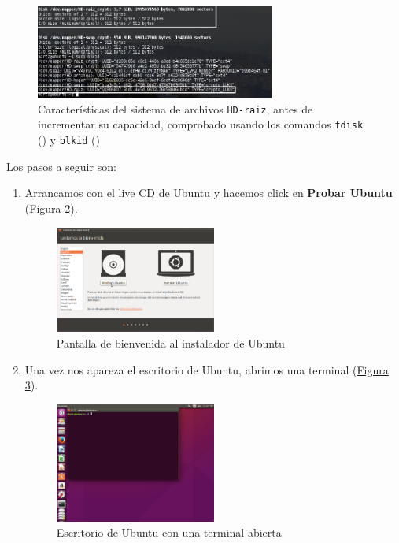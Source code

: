 \documentclass[10pt,a4paper,spanish]{article}
\numberwithin{equation}{section} %
\numberwithin{figure}{section} %
\numberwithin{table}{section} %
\begin{document}
\begin{figure}[!h]
    \centering
    \includegraphics[width=0.7\textwidth]{27}
    \caption{Características del sistema de archivos \texttt{HD-raiz}, antes de incrementar su capacidad, comprobado usando los comandos \texttt{fdisk} (\cite{fdisk}) y \texttt{blkid} (\cite{blkid})}
    \label{antes}
\end{figure}

Los pasos a seguir son:
\begin{enumerate}[1.]
    \item Arrancamos con el live CD de Ubuntu y hacemos click en \textbf{Probar Ubuntu} (\hyperref[instalador]{Figura \ref*{instalador}}).
\begin{figure}[!h]
    \centering
    \includegraphics[width=0.5\textwidth]{28}
    \caption{Pantalla de bienvenida al instalador de Ubuntu}
    \label{instalador}
\end{figure}

    \item Una vez nos apareza el escritorio de Ubuntu, abrimos una terminal (\hyperref[terminal]{Figura \ref*{terminal}}).

\begin{figure}[!h]
    \centering
    \includegraphics[width=0.5\textwidth]{29}
    \caption{Escritorio de Ubuntu con una terminal abierta}
    \label{terminal}
\end{figure}


\end{enumerate}
\end{document}
